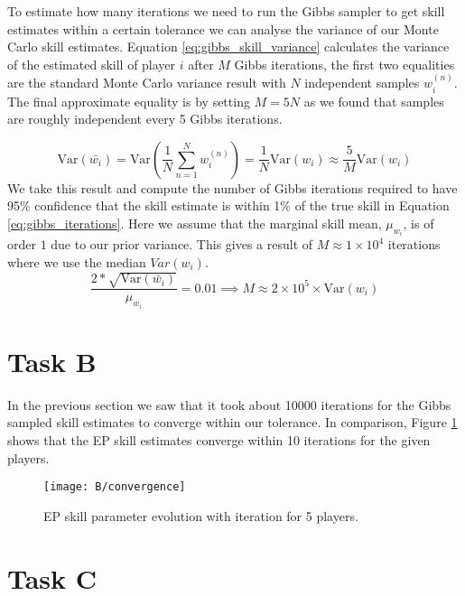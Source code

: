 \documentclass[11pt]{article}
\begin{document}
To estimate how many iterations we need to run the Gibbs sampler to get skill estimates within a certain tolerance we can analyse the variance of our Monte Carlo skill estimates. Equation \ref{eq:gibbs_skill_variance} calculates the variance of the estimated skill of player $i$ after $M$ Gibbs iterations, the first two equalities are the standard Monte Carlo variance result with $N$ independent samples $w_i^{(n)}$. The final approximate equality is by setting $M=5N$ as we found that samples are roughly independent every 5 Gibbs iterations.

\begin{equation}
    \text{Var}(\bar{w_i}) = \text{Var}(\frac{1}{N} \sum_{n=1}^{N} w_i^{(n)})  = \frac{1}{N} \text{Var}(w_i) \approx \frac{5}{M} \text{Var}(w_i)
    \label{eq:gibbs_skill_variance}
\end{equation}
We take this result and compute the number of Gibbs iterations required to have 95\% confidence that the skill estimate is within 1\% of the true skill in Equation \ref{eq:gibbs_iterations}. Here we assume that the marginal skill mean, $\mu_{w_i}$, is of order $1$ due to our prior variance. This gives a result of $M \approx 1\times10^4$ iterations where we use the median $Var(w_i)$.
\begin{equation}
    \frac{2*\sqrt{\text{Var}(\bar{w_i})}}{\mu_{w_i}} = 0.01 \implies M \approx 2\times10^5 \times \text{Var}(w_i)
    \label{eq:gibbs_iterations}
\end{equation}

\section{Task B}

In the previous section we saw that it took about 10000 iterations for the Gibbs sampled skill estimates to converge within our tolerance. In comparison, Figure \ref{fig:B_convergence} shows that the EP skill estimates converge within 10 iterations for the given players.

\begin{figure}[h]
    \centering
    \texttt{[image: B/convergence]} 
    \caption{EP skill parameter evolution with iteration for 5 players.}
    \label{fig:B_convergence}
\end{figure}

\section{Task C}
\end{document}
